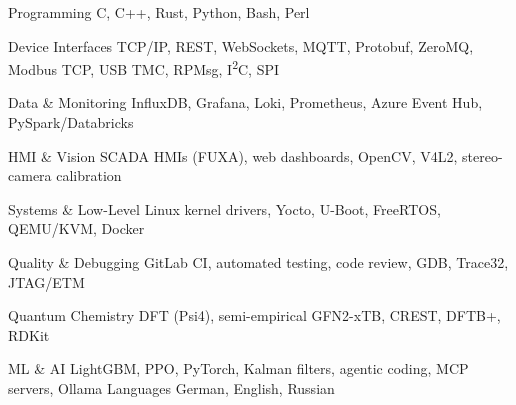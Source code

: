 

\begin{cvskills}

  \cvskill
    {Programming} %
    {C, C++, Rust, Python, Bash, Perl} %

  \cvskill
    {Device Interfaces} %
    {TCP/IP, REST, WebSockets, MQTT, Protobuf, ZeroMQ, Modbus TCP, USB TMC, RPMsg, I\textsuperscript{2}C, SPI} %

  \cvskill
    {Data \& Monitoring} %
    {InfluxDB, Grafana, Loki, Prometheus, Azure Event Hub, PySpark/Databricks} %

  \cvskill
    {HMI \& Vision} %
    {SCADA HMIs (FUXA), web dashboards, OpenCV, V4L2, stereo-camera calibration} %

  \cvskill
    {Systems \& Low-Level} %
    {Linux kernel drivers, Yocto, U-Boot, FreeRTOS, QEMU/KVM, Docker} %

  \cvskill
    {Quality \& Debugging} %
    {GitLab CI, automated testing, code review, GDB, Trace32, JTAG/ETM} %

  \cvskill
    {Quantum Chemistry} %
    {DFT (Psi4), semi-empirical GFN2-xTB, CREST, DFTB+, RDKit} %

  \cvskill
    {ML \& AI} %
    {LightGBM, PPO, PyTorch, Kalman filters, agentic coding, MCP servers, Ollama} %
  \cvskill
    {Languages} %
    {German, English, Russian} %

\end{cvskills}
